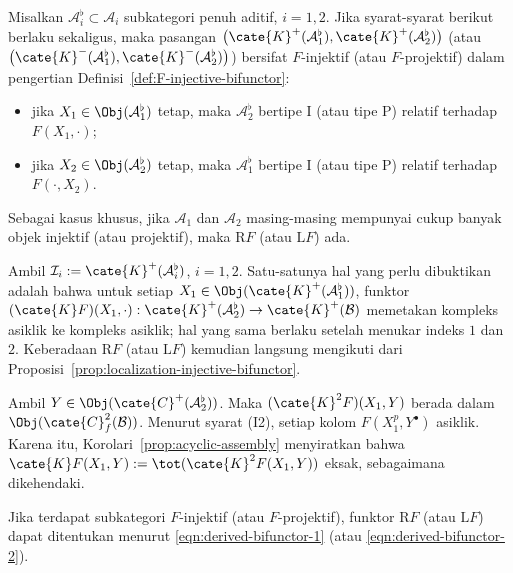 \begin{lema}\label{prop:RF-bifunctor}
	Misalkan $\mathcal{A}_i^\flat\subset\mathcal{A}_i$ subkategori penuh aditif,
	$i=1,2$. Jika syarat-syarat berikut berlaku sekaligus, maka pasangan
	$\bigl(\cate{K}^+(\mathcal{A}_1^\flat),
	\cate{K}^+(\mathcal{A}_2^\flat)\bigr)$ (atau
	$\bigl(\cate{K}^-(\mathcal{A}_1^\flat),
	\cate{K}^-(\mathcal{A}_2^\flat)\bigr)$) bersifat $F$-injektif (atau
	$F$-projektif) dalam pengertian
	Definisi~\ref{def:F-injective-bifunctor}:
	\begin{itemize}
		\item jika $X_1\in\Obj(\mathcal{A}_1^\flat)$ tetap, maka
		$\mathcal{A}_2^\flat$ bertipe I (atau tipe P) relatif terhadap
		$F(X_1,\cdot)$;
		\item jika $X_2\in\Obj(\mathcal{A}_2^\flat)$ tetap, maka
		$\mathcal{A}_1^\flat$ bertipe I (atau tipe P) relatif terhadap
		$F(\cdot,X_2)$.
	\end{itemize}
	Sebagai kasus khusus, jika $\mathcal{A}_1$ dan $\mathcal{A}_2$ masing-masing
	mempunyai cukup banyak objek injektif (atau projektif), maka
	$\mathrm{R}F$ (atau $\mathrm{L}F$) ada.
\end{lema}
\begin{bukti}
	Ambil $\mathcal{I}_i:=\cate{K}^+(\mathcal{A}_i^\flat)$, $i=1,2$. Satu-satunya
	hal yang perlu dibuktikan adalah bahwa untuk setiap
	$X_1\in\Obj(\cate{K}^+(\mathcal{A}_1^\flat))$, funktor
	$(\cate{K}F)(X_1,\cdot):\cate{K}^+(\mathcal{A}_2^\flat)
	\to\cate{K}^+(\mathcal{B})$ memetakan kompleks asiklik ke kompleks
	asiklik; hal yang sama berlaku setelah menukar indeks $1$ dan $2$.
	Keberadaan $\mathrm{R}F$ (atau $\mathrm{L}F$) kemudian langsung mengikuti
	dari Proposisi~\ref{prop:localization-injective-bifunctor}.

	Ambil $Y\in\Obj(\cate{C}^+(\mathcal{A}_2^\flat))$. Maka
	$(\cate{K}^2F)(X_1,Y)$ berada dalam
	$\Obj(\cate{C}^2_f(\mathcal{B}))$. Menurut syarat (I2), setiap kolom
	$F(X_1^p,Y^\bullet)$ asiklik. Karena itu,
	Korolari~\ref{prop:acyclic-assembly} menyiratkan bahwa
	$\cate{K}F(X_1,Y):=\tot(\cate{K}^2F(X_1,Y))$ eksak, sebagaimana
	dikehendaki.
\end{bukti}

Jika terdapat subkategori $F$-injektif (atau $F$-projektif), funktor
$\mathrm{R}F$ (atau $\mathrm{L}F$) dapat ditentukan menurut
\eqref{eqn:derived-bifunctor-1} (atau \eqref{eqn:derived-bifunctor-2}).
